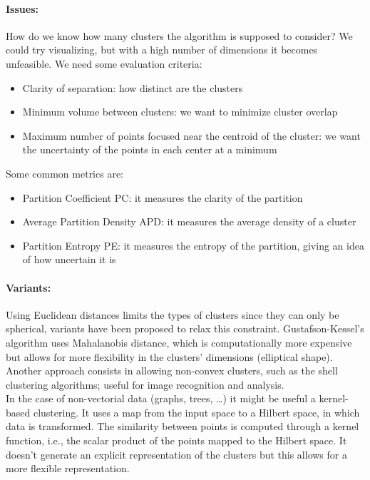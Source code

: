 \paragraph{Issues:} How do we know how many clusters the algorithm is supposed to consider? We could try visualizing, but with a high number of dimensions it becomes unfeasible. We need some evaluation criteria:
\begin{itemize}
	\item Clarity of separation: how distinct are the clusters
	\item Minimum volume between clusters: we want to minimize cluster overlap
	\item Maximum number of points focused near the centroid of the cluster: we want the uncertainty of the points in each center at a minimum
\end{itemize}
Some common metrics are: 
\begin{itemize}
	\item Partition Coefficient PC: it measures the clarity of the partition
	\item Average Partition Density APD: it measures the average density of a cluster
	\item Partition Entropy PE: it measures the entropy of the partition, giving an idea of how uncertain it is
\end{itemize}

\paragraph{Variants:} Using Euclidean distances limits the types of clusters since they can only be spherical, variants have been proposed to relax this constraint. Gustafson-Kessel's algorithm uses Mahalanobis distance, which is computationally more expensive but allows for more flexibility in the clusters' dimensions (elliptical shape).\\

Another approach consists in allowing non-convex clusters, such as the shell clustering algorithms; useful for image recognition and analysis.\\

In the case of non-vectorial data (graphs, trees, \dots) it might be useful a kernel-based clustering. It uses a map from the input space to a Hilbert space, in which data is transformed. The similarity between points is computed through a kernel function, i.e., the scalar product of the points mapped to the Hilbert space. It doesn't generate an explicit representation of the clusters but this allows for a more flexible representation.\\

